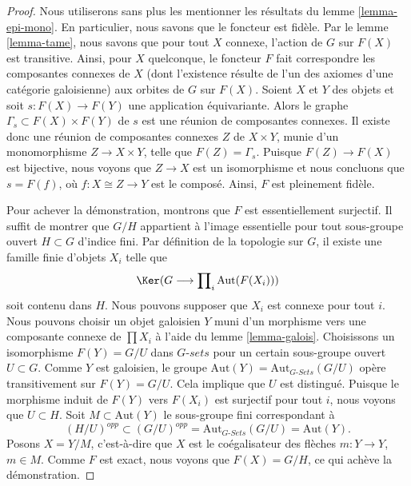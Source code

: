 \begin{proof}
Nous utiliserons sans plus les mentionner les résultats du lemme \ref{lemma-epi-mono}.
En particulier, nous savons que le foncteur est fidèle.
Par le lemme \ref{lemma-tame}, nous savons que pour tout $X$ connexe,
l'action de $G$ sur $F(X)$ est transitive. Ainsi, pour $X$ quelconque, le foncteur
$F$ fait correspondre les composantes connexes de $X$ (dont l'existence résulte
de l'un des axiomes d'une catégorie galoisienne) aux orbites de $G$ sur $F(X)$.
Soient $X$ et $Y$ des objets et soit
$s : F(X) \to F(Y)$ une application équivariante. Alors le graphe
$\Gamma_s \subset F(X) \times F(Y)$ de $s$
est une réunion de composantes connexes. Il existe donc une
réunion de composantes connexes $Z$ de $X \times Y$,
munie d'un monomorphisme $Z \to X \times Y$,
telle que $F(Z) = \Gamma_s$. Puisque $F(Z) \to F(X)$ est bijective,
nous voyons que $Z \to X$ est un isomorphisme et nous concluons
que $s = F(f)$, où $f : X \cong Z \to Y$ est le composé.
Ainsi, $F$ est pleinement fidèle.

\medskip\noindent
Pour achever la démonstration, montrons que $F$ est essentiellement surjectif.
Il suffit de montrer que $G/H$ appartient à l'image essentielle pour
tout sous-groupe ouvert $H \subset G$ d'indice fini.
Par définition de la topologie sur $G$, il existe une famille finie
d'objets $X_i$ telle que
$$
\Ker(G \longrightarrow \prod\nolimits_i \text{Aut}(F(X_i)))
$$
soit contenu dans $H$. Nous pouvons supposer que $X_i$ est connexe
pour tout $i$. Nous pouvons choisir un objet galoisien $Y$ muni d'un morphisme
vers une composante connexe de $\prod X_i$ à l'aide du
lemme \ref{lemma-galois}. Choisissons un isomorphisme $F(Y) = G/U$
dans $G\textit{-sets}$ pour un certain sous-groupe ouvert $U \subset G$.
Comme $Y$ est galoisien, le groupe
$\text{Aut}(Y) = \text{Aut}_{G\textit{-Sets}}(G/U)$ opère transitivement
sur $F(Y) = G/U$. Cela implique que $U$ est distingué. Puisque
le morphisme induit de $F(Y)$ vers $F(X_i)$ est surjectif pour tout $i$, nous voyons que
$U \subset H$. Soit $M \subset \text{Aut}(Y)$ le sous-groupe fini
correspondant à
$$
(H/U)^{opp} \subset (G/U)^{opp} = \text{Aut}_{G\textit{-Sets}}(G/U)
= \text{Aut}(Y).
$$
Posons $X = Y/M$, c'est-à-dire que $X$ est le coégalisateur
des flèches $m : Y \to Y$, $m \in M$.
Comme $F$ est exact, nous voyons que $F(X) = G/H$, ce qui achève
la démonstration.
\end{proof}

